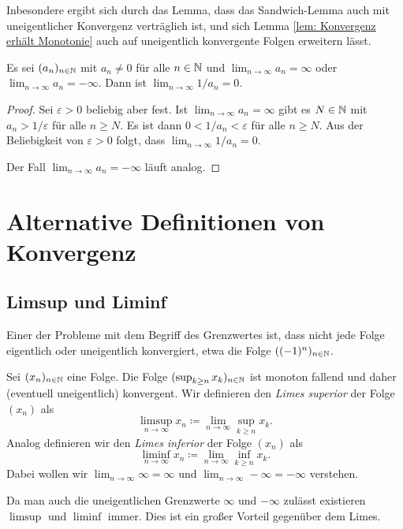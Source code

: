 \documentclass[a4paper,10pt]{article}
\begin{document}
Inbesondere ergibt sich durch das Lemma, dass das Sandwich-Lemma auch mit uneigentlicher Konvergenz verträglich ist, und sich Lemma \ref{lem: Konvergenz erhält Monotonie} auch auf uneigentlich konvergente Folgen erweitern lässt.


\begin{lem}
 Es sei $(a_n)_{n \in \mathbb{N}}$ mit $a_n \neq 0$ für alle $n \in \mathbb{N}$ und $\lim_{n \to \infty} a_n = \infty$ oder $\lim_{n \to \infty} a_n = -\infty$. Dann ist $\lim_{n \to \infty} 1/a_n = 0$.
\end{lem}
\begin{proof}
 Sei $\varepsilon > 0$ beliebig aber fest. Ist $\lim_{n \to \infty} a_n = \infty$ gibt es $N \in \mathbb{N}$ mit $a_n > 1/\varepsilon$ für alle $n \geq N$. Es ist dann $0 < 1/a_n < \varepsilon$ für alle $n \geq N$. Aus der Beliebigkeit von $\varepsilon > 0$ folgt, dass $\lim_{n \to \infty} 1/a_n = 0$.
 
 Der Fall $\lim_{n \to \infty} a_n = -\infty$ läuft analog.
\end{proof}





\section{Alternative Definitionen von Konvergenz}



\subsection{Limsup und Liminf}
Einer der Probleme mit dem Begriff des Grenzwertes ist, dass nicht jede Folge eigentlich oder uneigentlich konvergiert, etwa die Folge $((-1)^n)_{n \in \mathbb{N}}$.


\begin{defi}
 Sei $(x_n)_{n \in \mathbb{N}}$ eine Folge. Die Folge $(\sup_{k \geq n} x_k)_{n \in \mathbb{N}}$ ist monoton fallend und daher (eventuell uneigentlich) konvergent. Wir definieren den \emph{Limes superior} der Folge $(x_n)$ als
 \[
  \limsup_{n \to \infty} x_n \coloneqq \lim_{n \to \infty} \sup_{k \geq n} x_k.
 \]
 Analog definieren wir den \emph{Limes inferior} der Folge $(x_n)$ als
 \[
  \liminf_{n \to \infty} x_n \coloneqq \lim_{n \to \infty} \inf_{k \geq n} x_k.
 \]
 Dabei wollen wir $\lim_{n \to \infty} \infty = \infty$ und $\lim_{n \to \infty} -\infty = -\infty$ verstehen.
\end{defi}


\begin{bem}
 Da man auch die uneigentlichen Grenzwerte $\infty$ und $-\infty$ zulässt existieren $\limsup$ und $\liminf$ immer. Dies ist ein großer Vorteil gegenüber dem Limes.
\end{bem}
\end{document}
